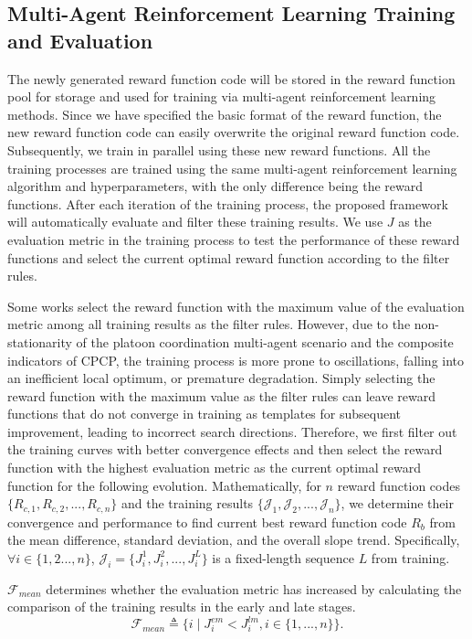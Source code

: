 \documentclass[lettersize,journal]{IEEEtran}
\begin{document}
\subsection{Multi-Agent Reinforcement Learning Training and Evaluation}
The newly generated reward function code will be stored in the reward function pool for storage and used for training via multi-agent reinforcement learning methods. 
Since we have specified the basic format of the reward function, the new reward function code can easily overwrite the original reward function code. 
Subsequently, we train in parallel using these new reward functions. All the training processes are trained using the same multi-agent reinforcement learning algorithm and hyperparameters, with the only difference being the reward functions.
After each iteration of the training process, the proposed framework will automatically evaluate and filter these training results. 
We use $J$ as the evaluation metric in the training process to test the performance of these reward functions and select the current optimal reward function according to the filter rules.

Some works select the reward function with the maximum value of the evaluation metric among all training results as the filter rules. 
However, due to the non-stationarity of the platoon coordination multi-agent scenario and the composite indicators of CPCP, the training process is more prone to oscillations, falling into an inefficient local optimum, or premature degradation. 
Simply selecting the reward function with the maximum value as the filter rules can leave reward functions that do not converge in training as templates for subsequent improvement, leading to incorrect search directions. 
Therefore, we first filter out the training curves with better convergence effects and then select the reward function with the highest evaluation metric as the current optimal reward function for the following evolution.
Mathematically, for $n$ reward function codes $\{R_{c,1},R_{c,2},...,R_{c,n}\}$ and the training results $\{\mathcal{J}_1,\mathcal{J}_2,...,\mathcal{J}_n\}$, we determine their convergence and performance to find current best reward function code $R_{b}$ from the mean difference, standard deviation, and the overall slope trend.
Specifically, $\forall i \in \{1,2...,n\}$, $\mathcal{J}_i = \{J_i^1, J_i^2, ..., J_i^L\}$ is a fixed-length sequence $L$ from training. 

$\mathcal{F}_{mean}$ determines whether the evaluation metric has increased by calculating the comparison of the training results in the early and late stages.
\begin{equation}
\label{eqmean}
    \mathcal{F}_{mean} \triangleq \{i \mid J_i^{em} < J_i^{lm}, i\in \{1,...,n\}\}.
\end{equation}
\end{document}
